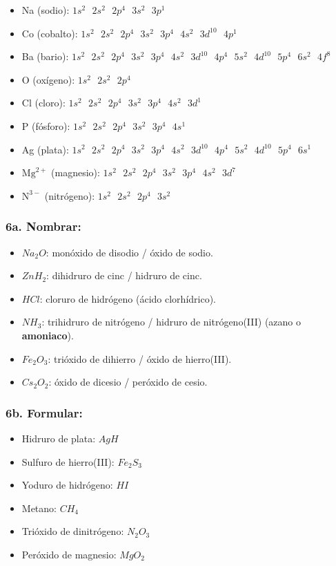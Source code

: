 \documentclass[12pt,a4paper]{article}
\begin{document}
\begin{itemize}
	\item Na (sodio): \(1s^2\text{ }2s^2\text{ }2p^4\text{ }3s^2\text{ }3p^1\)
	\item Co (cobalto): \(1s^2\text{ }2s^2\text{ }2p^4\text{ }3s^2\text{ }3p^4\text{ }4s^2\text{ }3d^10\text{ }4p^1\)
	\item Ba (bario): \(1s^2\text{ }2s^2\text{ }2p^4\text{ }3s^2\text{ }3p^4\text{ }4s^2\text{ }3d^10\text{ }4p^4\text{ }5s^2\text{ }4d^10\text{ }5p^4\text{ }6s^2\text{ }4f^8\)
	\item O (oxígeno): \(1s^2\text{ }2s^2\text{ }2p^4\)
	\item Cl (cloro): \(1s^2\text{ }2s^2\text{ }2p^4\text{ }3s^2\text{ }3p^4\text{ }4s^2\text{ }3d^1\)
	\item P (fósforo): \(1s^2\text{ }2s^2\text{ }2p^4\text{ }3s^2\text{ }3p^4\text{ }4s^1\)
	\item Ag (plata): \(1s^2\text{ }2s^2\text{ }2p^4\text{ }3s^2\text{ }3p^4\text{ }4s^2\text{ }3d^10\text{ }4p^4\text{ }5s^2\text{ }4d^10\text{ }5p^4\text{ }6s^1\)
	\item \(\text{Mg}^{2+}\) (magnesio): \(1s^2\text{ }2s^2\text{ }2p^4\text{ }3s^2\text{ }3p^4\text{ }4s^2\text{ }3d^7\)
	\item \(\text{N}^{3-}\) (nitrógeno): \(1s^2\text{ }2s^2\text{ }2p^4\text{ }3s^2\)
\end{itemize}

\subsubsection*{6a. Nombrar:}

\begin{itemize}
	\item \(Na_2O\): monóxido de disodio / óxido de sodio.
	\item \(ZnH_2\): dihidruro de cinc / hidruro de cinc.
	\item \(HCl\): cloruro de hidrógeno (ácido clorhídrico).
	\item \(NH_3\): trihidruro de nitrógeno / hidruro de nitrógeno(III) (azano o \textbf{amoniaco}).
	\item \(Fe_2O_3\): trióxido de dihierro / óxido de hierro(III).
	\item \(Cs_2O_2\): óxido de dicesio / peróxido de cesio.
\end{itemize}

\subsubsection*{6b. Formular:}

\begin{itemize}
	\item Hidruro de plata: \(AgH\)
	\item Sulfuro de hierro(III): \(Fe_2S_3\)
	\item Yoduro de hidrógeno: \(HI\)
	\item Metano: \(CH_4\)
	\item Trióxido de dinitrógeno: \(N_2O_3\)
	\item Peróxido de magnesio: \(MgO_2\)
\end{itemize}
\end{document}

